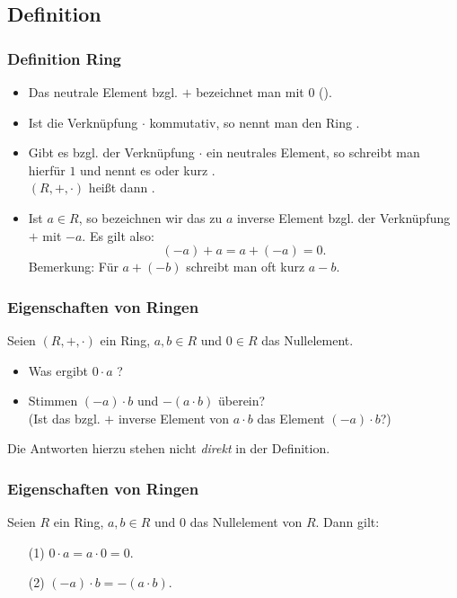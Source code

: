 \subsection{Definition}
%
\begin{frame}\frametitle{Definition Ring}
	
	\begin{itemize}
		\item Das neutrale Element bzgl. $+$ bezeichnet man mit $0$ (). \pause
		\item Ist die Verkn\"upfung $\cdot$ kommutativ, so nennt man den Ring . \pause
		\item Gibt es bzgl. der Verkn\"upfung $\cdot$ ein neutrales Element, so schreibt man hierf\"ur $1$ und nennt es  oder kurz .\\
			$(R,+,\cdot)$ hei{\ss}t dann .\pause
		\item Ist $a\in R$, so bezeichnen wir das zu $a$ inverse Element bzgl. der Verkn\"upfung $+$ mit $-a$. Es gilt also:
			$$
				(-a) + a = a + (-a) = 0.
			$$
		Bemerkung: F\"ur $a + (-b)$ schreibt man oft kurz $a-b$. 
	\end{itemize}
	
\end{frame}
%
%
\begin{frame}\frametitle{Eigenschaften von Ringen} 
		
	Seien $(R,+,\cdot)$ ein Ring, $a,b \in R$ und $0\in R$ das Nullelement.
	\begin{itemize}
		\item Was ergibt $0\cdot a$ ?
		\item Stimmen $(-a)\cdot b$ und $-(a\cdot b)$ \"uberein?\\
			(Ist das bzgl. $+$ inverse Element von $a\cdot b$ das Element $(-a)\cdot b$?)
	\end{itemize} \pause
	
	\vspace{2mm}
	Die Antworten hierzu stehen nicht {\em direkt} in der Definition.
		
\end{frame}
%
%
\begin{frame}\frametitle{Eigenschaften von Ringen} 
	
	Seien $R$ ein Ring, $a,b \in R$ und $0$ das Nullelement von $R$. 
	Dann gilt:
	\begin{itemize}
		\item[(1)] $0\cdot a = a\cdot 0 = 0$.
		\item[(2)] $(-a)\cdot b = -(a\cdot b)$.
	\end{itemize}
		
\end{frame}
